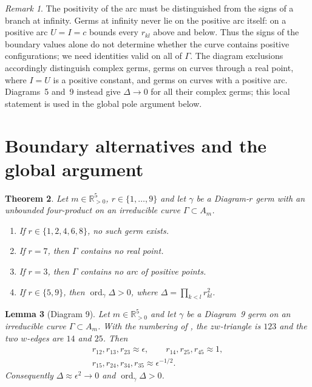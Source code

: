 \documentclass[11pt]{amsart}
\newenvironment{alphalist}{\begin{enumerate}\renewcommand{\labelenumi}{(\alph{enumi})}%
  \renewcommand{\theenumi}{\alph{enumi}}}{\end{enumerate}}
\newtheorem{theorem}{Theorem}[section]
\newtheorem{lemma}[theorem]{Lemma}
\theoremstyle{definition}
\theoremstyle{remark}
\newtheorem{remark}[theorem]{Remark}
\newcommand{\Rp}{\mathbb{R}_{>0}}
\newcommand{\ord}{\operatorname{ord}}
\begin{document}
\begin{remark}\label{rem:levels}
The positivity of the arc must be distinguished from the signs of a branch at infinity.
Germs at infinity never lie on the positive arc itself: on a positive arc $U=I=c$ bounds every
$r_{kl}$ above and below.  Thus the signs of the boundary values alone do not determine whether the curve contains
positive configurations; we need identities valid on all of $\Gamma$.
{The diagram exclusions accordingly distinguish complex germs,
germs on curves through a real point, where $I=U$ is a positive constant, and germs on curves
with a positive arc.  Diagrams~5 and~9 instead give $\Delta\to0$ for all their complex germs;
this local statement is used in the global pole argument below.}
\end{remark}


{
\section{Boundary alternatives and the global argument}\label{sec:exclusion}

\begin{theorem}\label{thm:exclusion}
Let $m\in\Rp^5$, $r\in\{1,\dots,9\}$ and let $\gamma$ be a Diagram-$r$ germ with an unbounded
four-product on an irreducible curve $\Gamma\subset A_m$.
\begin{alphalist}
  \item If $r\in\{1,2,4,6,8\}$, no such germ exists.
  \item If $r=7$, then $\Gamma$ contains no real point.
  \item If $r=3$, then $\Gamma$ contains no arc of positive points.
  \item If $r\in\{5,9\}$, then $\ord_\gamma\Delta>0$, where $\Delta=\prod_{k<l}r_{kl}^2$.
\end{alphalist}
\end{theorem}


\begin{lemma}[Diagram 9]\label{lem:d9-product}
Let $m\in\Rp^5$ and let $\gamma$ be a Diagram~9 germ on an irreducible curve
$\Gamma\subset A_m$.  With the numbering of \cite[\S\S7.5.1.2 and~8.9]{AK}, the
$zw$-triangle is $123$ and the two $w$-edges are $14$ and $25$.  Then
\begin{equation}\label{eq:d9-distances}
\begin{gathered}
 r_{12},r_{13},r_{23}\approx\epsilon,\qquad
 r_{14},r_{25},r_{45}\approx1,\\
 r_{15},r_{24},r_{34},r_{35}\approx\epsilon^{-1/2}.
\end{gathered}
\end{equation}
Consequently $\Delta\approx\epsilon^2\to0$ and $\ord_\gamma\Delta>0$.
\end{lemma}

}
\end{document}
